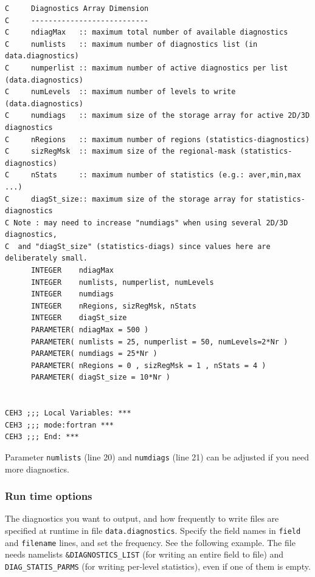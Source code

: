 \documentclass[11pt]{article}
\begin{document}
\begin{lstlisting}[caption={Example \texttt{DIAGNOSTICS\symbol{95}SIZE.h} file}, captionpos=b]
C     Diagnostics Array Dimension
C     ---------------------------
C     ndiagMax   :: maximum total number of available diagnostics
C     numlists   :: maximum number of diagnostics list (in data.diagnostics)
C     numperlist :: maximum number of active diagnostics per list (data.diagnostics)
C     numLevels  :: maximum number of levels to write    (data.diagnostics)
C     numdiags   :: maximum size of the storage array for active 2D/3D diagnostics
C     nRegions   :: maximum number of regions (statistics-diagnostics)
C     sizRegMsk  :: maximum size of the regional-mask (statistics-diagnostics)
C     nStats     :: maximum number of statistics (e.g.: aver,min,max ...)
C     diagSt_size:: maximum size of the storage array for statistics-diagnostics
C Note : may need to increase "numdiags" when using several 2D/3D diagnostics,
C  and "diagSt_size" (statistics-diags) since values here are deliberately small.
      INTEGER    ndiagMax
      INTEGER    numlists, numperlist, numLevels
      INTEGER    numdiags
      INTEGER    nRegions, sizRegMsk, nStats
      INTEGER    diagSt_size
      PARAMETER( ndiagMax = 500 )
      PARAMETER( numlists = 25, numperlist = 50, numLevels=2*Nr )
      PARAMETER( numdiags = 25*Nr )
      PARAMETER( nRegions = 0 , sizRegMsk = 1 , nStats = 4 )
      PARAMETER( diagSt_size = 10*Nr )


CEH3 ;;; Local Variables: ***
CEH3 ;;; mode:fortran ***
CEH3 ;;; End: ***
\end{lstlisting}

Parameter \verb|numlists| (line 20) and \verb|numdiags| (line 21) can be adjusted if you need more diagnostics.

\subsubsection*{Run time options}
The diagnostics you want to output, and how frequently to write files are specified at runtime in file \verb|data.diagnostics|. Specify the field names in \verb|field| and \verb|filename| lines, and set the frequency. See the following example. The file needs namelists \verb|&DIAGNOSTICS_LIST| (for writing an entire field to file) and \verb|DIAG_STATIS_PARMS| (for writing per-level statistics), even if one of them is empty.
\end{document}
